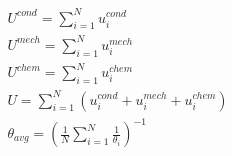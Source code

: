 \pagestyle{empty}


\begin{eqnarray*}
   U^{cond} = \displaystyle\sum_{i=1}^{N} u_{i}^{cond} \\ 
   U^{mech} = \displaystyle\sum_{i=1}^{N} u_{i}^{mech} \\
   U^{chem} = \displaystyle\sum_{i=1}^{N} u_{i}^{chem} \\
   U = \displaystyle\sum_{i=1}^{N} (u_{i}^{cond} + u_{i}^{mech} + u_{i}^{chem}) \\
   \theta_{avg} = (\frac{1}{N}\displaystyle\sum_{i=1}^{N} \frac{1}{\theta_{i}})^{-1} \\
\end{eqnarray*}                           


